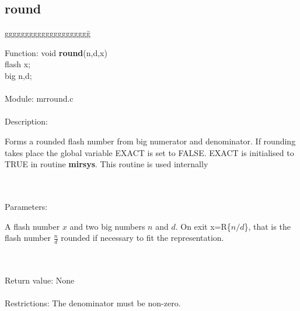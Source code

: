 \subsection{round}

\begin{tabbing}
ggggggggggggggggggggg\= \kill

      Function:      \>void {\bf round}(n,d,x) \\
                     \>flash x; \\
                     \>big n,d; \\
      \ \\
      Module:        \>mrround.c \\
      \ \\
      Description:   \>
                     \parbox[t]{3in}
                     {Forms a rounded flash number from big numerator and
                     denominator. If rounding takes place the global variable
                     EXACT is set to FALSE. EXACT is initialised to TRUE in
                     routine {\bf mirsys}. This routine is used internally} \\
      \ \\
      Parameters:    \>
                     \parbox[t]{3in}
                     {A flash number $x$ and two big numbers $n$ and $d$. On exit
                     x=R\{$n/d$\}, that is the flash number $\frac{n}{d}$ rounded if
                     necessary to fit the representation.} \\
      \ \\
      Return value:  \>None \\
      \ \\
      Restrictions:  \>The denominator must be non-zero. \\

\end{tabbing}

\appendix
\cleardoublepage
